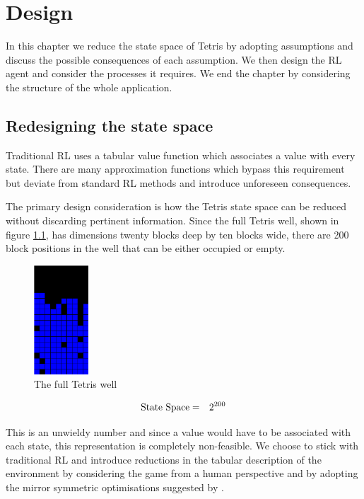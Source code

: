 \documentclass{rucsthesis}
\begin{document}
\chapter{Design}

In this chapter we reduce the state space of Tetris by adopting assumptions and discuss the possible consequences of each assumption. We then design the RL agent and consider the processes it requires. We end the chapter by considering the structure of the whole application.

\section{Redesigning the state space}

Traditional RL uses a tabular value function which associates a value with every state. There are many approximation functions which bypass this requirement but deviate from standard RL methods and introduce unforeseen consequences.

The primary design consideration is how the Tetris state space can be reduced without discarding pertinent information. Since the full Tetris well, shown in figure \ref{fig:fullwell}, has dimensions twenty blocks deep by ten blocks wide, there are 200 block positions in the well that can be either occupied or empty.

\begin{figure}[h]
\centering
\includegraphics[width=0.8in]{fullwell.png}
\caption{The full Tetris well}
\label{fig:fullwell}
\end{figure}

\begin{eqnarray*}
\centering
\textrm{State Space} & = & 2^{200} 
\end{eqnarray*}

This is an unwieldy number and since a value would have to be associated with each state, this representation is completely non-feasible. We choose to stick with traditional RL and introduce reductions in the tabular description of the environment by considering the game from a human perspective and by adopting the mirror symmetric optimisations suggested by \cite{yaeltetris}. 
\end{document}
